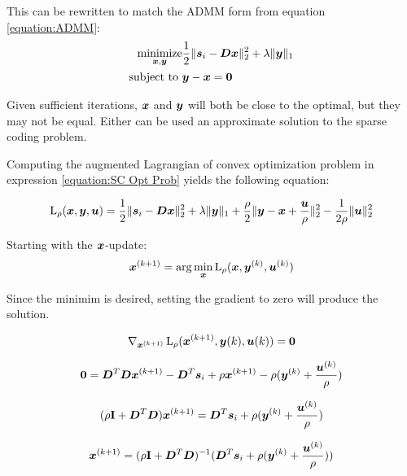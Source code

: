 This can be rewritten to match the ADMM form from equation \ref{equation:ADMM}:
\begin{equation} \label{equation:SC Opt Prob}
\begin{aligned}
\operatorname*{\text{minimize}}_{\bm{x},\bm{y}} & \frac{1}{2} \|\bm{s}_i - \bm{D}\bm{x}\|_2^2 + \lambda\|\bm{y}\|_1 \\
         \text{subject to } & \bm{y} - \bm{x} = \bm{0}
\end{aligned}
\end{equation}

Given sufficient iterations, $\bm{x}$ and $\bm{y}$ will both be close to the optimal, but they may not be equal. Either can be used an approximate solution to the sparse coding problem.

Computing the augmented Lagrangian of convex optimization problem in expression \ref{equation:SC Opt Prob} yields the following equation:

\begin{equation}
\operatorname{L}_{\rho}(\bm{x},\bm{y},\bm{u}) = \frac{1}{2} \|\bm{s}_i - \bm{D}\bm{x}\|_2^2 + \lambda\|\bm{y}\|_1 + \frac{\rho}{2}\|\bm{y} - \bm{x} + \frac{\bm{u}}{\rho}\|_2^2 - \frac{1}{2\rho}\|\bm{u}\|_2^2
\end{equation}

Starting with the $\bm{x}$-update:
\begin{equation}
\bm{x}^{(k + 1)} = \arg\min_{\bm{x}} \operatorname{L}_{\rho}(\bm{x},\bm{y}^{(k)},\bm{u}^{(k)})
\end{equation}

Since the minimim is desired, setting the gradient to zero will produce the solution.

\begin{equation}
\nabla_{\bm{x}^{(k + 1)}} \operatorname{L}_{\rho}(\bm{x}^{(k + 1)},\bm{y}{(k)},\bm{u}{(k)}) = \bm{0}
\end{equation}

\begin{equation}
\bm{0} = \bm{D}^T\bm{D}\bm{x}^{(k + 1)} - \bm{D}^T\bm{s}_i + \rho\bm{x}^{(k + 1)} - \rho(\bm{y}^{(k)} + \frac{\bm{u}^{(k)}}{\rho})
\end{equation}

\begin{equation}
(\rho{\bf I} + \bm{D}^T\bm{D})\bm{x}^{(k + 1)} = \bm{D}^T\bm{s}_i + \rho(\bm{y}^{(k)} + \frac{\bm{u}^{(k)}}{\rho})
\end{equation}

\begin{equation}
\bm{x}^{(k + 1)} = (\rho{\bf I} + \bm{D}^T\bm{D})^{-1}(\bm{D}^T\bm{s}_i + \rho(\bm{y}^{(k)} + \frac{\bm{u}^{(k)}}{\rho}))
\end{equation}

